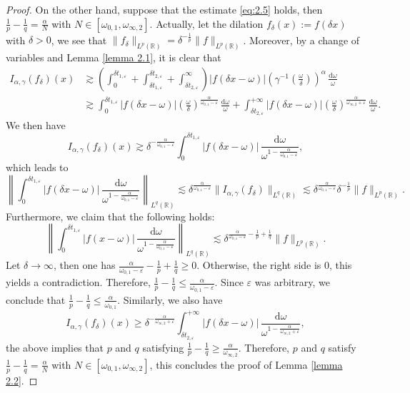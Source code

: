 \documentclass[11pt, twoside, leqno]{article}
\def\ls{\lesssim}
\def\gs{\gtrsim}
\theoremstyle{definition}
\numberwithin{equation}{section}
\begin{document}
\begin{proof}
On the other hand, suppose that the estimate \eqref{eq:2.5} holds, then ${\frac{1}{p}}-{\frac{1}{q}}={\frac{\alpha}{N}}$ with $N\in [{\omega_{0,1}},{\omega_{\infty,2}}]$. Actually, let the  dilation $f_{\delta}(x):=f(\delta x)$ with $\delta>0$, we see that $\|f_{\delta}\|_{L^{p}(\mathbb{R})}={\delta}^{-{\frac{1}{p}}}\|f\|_{L^{p}(\mathbb{R})}$. Moreover, by a change of variables and Lemma \ref{lemma 2.1}, it is clear that
\begin{align*}
I_{\alpha,\gamma}(f_{\delta})(x)&\gs \left(\int_{0}^{\delta t_{1,\varepsilon}}+ \int_{\delta t_{1,\varepsilon}}^{\delta t_{2,\varepsilon}}+ \int_{\delta t_{2,\varepsilon}}^{\infty}\right) |f(\delta x-\omega)|\left(\gamma^{-1}\left(\frac{\omega}{\delta}\right)\right)^{\alpha}\,\frac{\textrm{d}\omega}{\omega}  \\
&\gs \int_{0}^{\delta t_{1,\varepsilon}}|f(\delta x-\omega)|\left({{\frac{\omega}{\delta}}}\right)^{\frac{\alpha}{\omega_{0,1}-\varepsilon}}\,\frac{\textrm{d}\omega}{\omega}
  +\int_{\delta t_{2,\varepsilon}}^{+\infty}|f(\delta x-\omega)|\left({{\frac{\omega}{\delta}}}\right)^{\frac{\alpha}{\omega_{\infty,2}+\varepsilon}}\,\frac{\textrm{d}\omega}{\omega}.
\end{align*}
We then have
$$I_{\alpha,\gamma}(f_{\delta})(x)\gs\delta^{-\frac{\alpha}{\omega_{0,1}-\varepsilon}}\int_{0}^{\delta t_{1,\varepsilon}}|f(\delta x-\omega)|\,\frac{\textrm{d}\omega}{\omega^{1-{\frac{\alpha}{\omega_{0,1}-\varepsilon}}}},$$
which leads to
$$\left\|\int_{0}^{\delta t_{1,\varepsilon}}|f(\delta x-\omega)|\,\frac{\textrm{d}\omega}{\omega^{1-{\frac{\alpha}{\omega_{0,1}-\varepsilon}}}}\right\|_{L^{q}(\mathbb{R})}
  \ls\delta^{\frac{\alpha}{\omega_{0,1}-\varepsilon}}\|I_{\alpha,\gamma}(f_{\delta})\|_{L^{q}(\mathbb{R})}
  \ls\delta^{\frac{\alpha}{\omega_{0,1}-\varepsilon}}{\delta}^{-{\frac{1}{p}}}\|f\|_{L^{p}(\mathbb{R})}.$$
Furthermore, we claim that the following holds:
$$\left\|\int_{0}^{\delta t_{1,\varepsilon}}|f(x-\omega)|\,\frac{\textrm{d}\omega}{\omega^{1-{\frac{\alpha}{\omega_{0,1}-\varepsilon}}}}\right\|_{L^{q}(\mathbb{R})}
 \ls\delta^{\frac{\alpha}{\omega_{0,1}-\varepsilon}-\frac{1}{p}+ \frac{1}{q}}\|f\|_{L^{p}(\mathbb{R})}.$$
Let $\delta\rightarrow \infty$, then one has ${\frac{\alpha}{\omega_{0,1}-\varepsilon}}-{\frac{1}{p}}+{\frac{1}{q}}\geq0$. Otherwise, the right side is $0$, this yields a contradiction. Therefore, ${\frac{1}{p}}-{\frac{1}{q}}\leq{\frac{\alpha}{\omega_{0,1}-\varepsilon}}$. Since $\varepsilon$ was arbitrary, we conclude that $\frac{1}{p}-\frac{1}{q}\leq\frac{\alpha}{\omega_{0,1}}$.
Similarly, we also have
$$I_{\alpha,\gamma}(f_{\delta})(x)\geq\delta^{-\frac{\alpha}{\omega_{\infty,2}+\varepsilon}}\int_{\delta t_{2,\varepsilon}}^{+\infty}|f(\delta x-\omega)|\,\frac{\textrm{d}\omega}{\omega^{1-{\frac{\alpha}{\omega_{\infty,2}+\varepsilon}}}},$$
the above implies that $p$ and $q$ satisfying $\frac{1}{p}-\frac{1}{q}\geq\frac{\alpha}{\omega_{\infty,2}}$. Therefore, $p$ and $q$ satisfy
$\frac{1}{p}-\frac{1}{q}=\frac{\alpha}{N}$ with $N\in [\omega_{0,1}, \omega_{\infty,2}]$, this concludes the proof of Lemma \ref{lemma 2.2}.
\end{proof}
\end{document}
